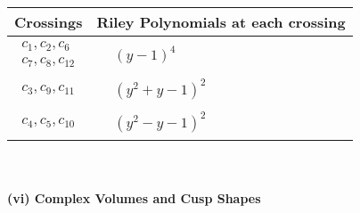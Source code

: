 \documentclass[1p]{elsarticle_modified}
\theoremstyle{definition}
\begin{document}
\begin{tabular}{m{50pt}|m{274pt}}
Crossings & \hspace{64pt}Riley Polynomials at each crossing \\
\hline $$\begin{aligned}c_{1},c_{2},c_{6}\\c_{7},c_{8},c_{12}\end{aligned}$$&$\begin{aligned}
&(y-1)^4
\end{aligned}$\\
\hline $$\begin{aligned}c_{3},c_{9},c_{11}\end{aligned}$$&$\begin{aligned}
&(y^2+y-1)^2
\end{aligned}$\\
\hline $$\begin{aligned}c_{4},c_{5},c_{10}\end{aligned}$$&$\begin{aligned}
&(y^2- y-1)^2
\end{aligned}$\\
\hline
\end{tabular}\\~\\
\newpage\flushleft \textbf{(vi) Complex Volumes and Cusp Shapes}
\end{document}
